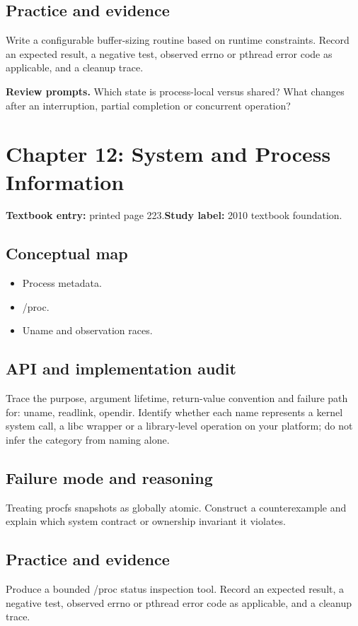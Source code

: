 \documentclass[11pt,letterpaper,oneside]{report}
\begin{document}
\subsection{Practice and evidence}
Write a configurable buffer-sizing routine based on runtime constraints. Record an expected result, a negative test, observed errno or pthread error code as applicable, and a cleanup trace.

\textbf{Review prompts.} Which state is process-local versus shared? What changes after an interruption, partial completion or concurrent operation?

\section{Chapter 12: System and Process Information}
\textbf{Textbook entry:} printed page 223.\quad \textbf{Study label:} 2010 textbook foundation.

\subsection{Conceptual map}
\begin{itemize}
\item Process metadata.
\item /proc.
\item Uname and observation races.
\end{itemize}
\subsection{API and implementation audit}
Trace the purpose, argument lifetime, return-value convention and failure path for: uname, readlink, opendir. Identify whether each name represents a kernel system call, a libc wrapper or a library-level operation on your platform; do not infer the category from naming alone.

\subsection{Failure mode and reasoning}
Treating procfs snapshots as globally atomic. Construct a counterexample and explain which system contract or ownership invariant it violates.

\subsection{Practice and evidence}
Produce a bounded /proc status inspection tool. Record an expected result, a negative test, observed errno or pthread error code as applicable, and a cleanup trace.
\end{document}
